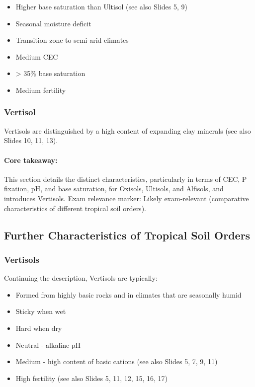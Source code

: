 \begin{itemize} 
    \item Higher base saturation than Ultisol (see also Slides 5, 9) 
    \item Seasonal moisture deficit 
    \item Transition zone to semi-arid climates 
    \item Medium CEC 
    \item > 35\% base saturation 
    \item Medium fertility 
\end{itemize}

\subsubsection{Vertisol} Vertisols are distinguished by a high content of expanding clay minerals (see also Slides 10, 11, 13).

\paragraph*{Core takeaway:} 
This section details the distinct characteristics, particularly in terms of CEC, P fixation, pH, and base saturation, for Oxisols, Ultisols, and Alfisols, and introduces Vertisols. Exam relevance marker: Likely exam-relevant (comparative characteristics of different tropical soil orders).

\subsection{Further Characteristics of Tropical Soil Orders} \subsubsection{Vertisols} Continuing the description, Vertisols are typically: 

\begin{itemize} 
    \item Formed from highly basic rocks and in climates that are seasonally humid 
    \item Sticky when wet 
    \item Hard when dry 
    \item Neutral - alkaline pH 
    \item Medium - high content of basic cations (see also Slides 5, 7, 9, 11) 
    \item High fertility (see also Slides 5, 11, 12, 15, 16, 17) 
\end{itemize}

